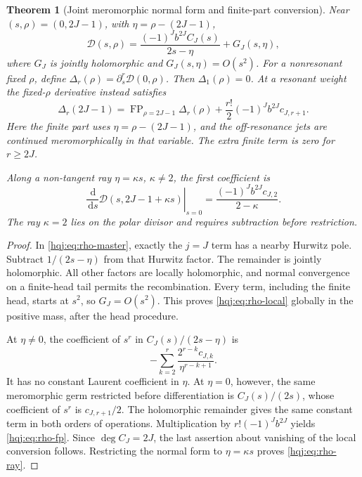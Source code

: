 \documentclass[11pt,letterpaper]{article}
\numberwithin{equation}{section}
\newtheorem{theorem}{Theorem}[section]
\theoremstyle{definition}
\newcommand{\FP}{\operatorname{FP}}
\newcommand{\dd}{\,\mathrm{d}}
\begin{document}
\begin{theorem}[Joint meromorphic normal form and finite-part conversion]
\label{hqj:thm:rho}
Near $(s,\rho)=(0,2J-1)$, with $\eta=\rho-(2J-1)$,
\begin{equation}\label{hqj:eq:rho-local}
\mathcal D(s,\rho)=
\frac{(-1)^Jb^{2J}C_J(s)}{2s-\eta}+G_J(s,\eta),
\end{equation}
where $G_J$ is jointly holomorphic and $G_J(s,\eta)=O(s^2)$.
For a nonresonant fixed $\rho$, define
$\Delta_r(\rho)=\partial_s^r\mathcal D(0,\rho)$.
Then $\Delta_1(\rho)=0$. At a resonant weight the fixed-$\rho$ derivative
instead satisfies
\begin{equation}\label{hqj:eq:rho-fp}
\boxed{\Delta_r(2J-1)
=\FP_{\rho=2J-1}\Delta_r(\rho)
+\frac{r!}{2}(-1)^Jb^{2J}c_{J,r+1}.}
\end{equation}
Here the finite part uses $\eta=\rho-(2J-1)$, and the off-resonance jets
are continued meromorphically in that variable. The extra finite term is
zero for $r\ge2J$.

Along a non-tangent ray $\eta=\kappa s$, $\kappa\ne2$, the first
coefficient is
\begin{equation}\label{hqj:eq:rho-ray}
\left.\frac{\dd}{\dd s}\mathcal D(s,2J-1+\kappa s)\right|_{s=0}
=\frac{(-1)^Jb^{2J}c_{J,2}}{2-\kappa}.
\end{equation}
The ray $\kappa=2$ lies on the polar divisor and requires subtraction
before restriction.
\end{theorem}
\begin{proof}
In \eqref{hqj:eq:rho-master}, exactly the $j=J$ term has a nearby
Hurwitz pole. Subtract $1/(2s-\eta)$ from that Hurwitz factor.
The remainder is jointly holomorphic. All other factors are locally
holomorphic, and normal convergence on a finite-head tail permits the
recombination. Every term, including the finite head, starts at $s^2$,
so $G_J=O(s^2)$. This proves \eqref{hqj:eq:rho-local} globally in the
positive mass, after the head procedure.

At $\eta\ne0$, the coefficient of $s^r$ in
$C_J(s)/(2s-\eta)$ is
\[
-\sum_{k=2}^r\frac{2^{r-k}c_{J,k}}{\eta^{r-k+1}}.
\]
It has no constant Laurent coefficient in $\eta$. At $\eta=0$, however,
the same meromorphic germ restricted before differentiation is
$C_J(s)/(2s)$, whose coefficient of $s^r$ is $c_{J,r+1}/2$.
The holomorphic remainder gives the same constant term in both orders
of operations. Multiplication by $r!(-1)^Jb^{2J}$ yields
\eqref{hqj:eq:rho-fp}. Since $\deg C_J=2J$, the last assertion about
vanishing of the local conversion follows. Restricting the normal form
to $\eta=\kappa s$ proves \eqref{hqj:eq:rho-ray}.
\end{proof}
\end{document}
